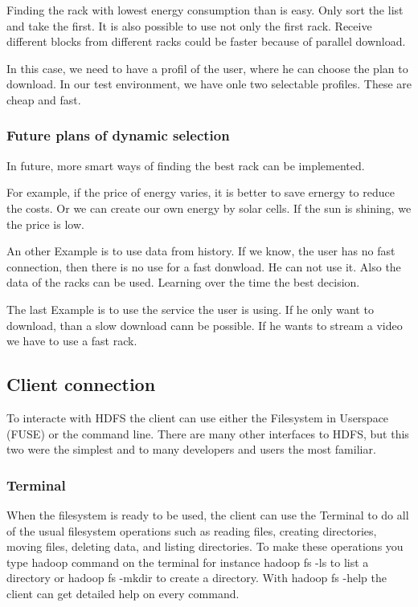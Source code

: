 Finding the rack with lowest energy consumption than is easy. Only sort the list and take the first. It is also possible to use not only the first rack. Receive different blocks from different racks could be faster because of parallel download.

In this case, we need to have a profil of the user, where he can choose the plan to download. In our test environment, we have onle two selectable profiles. These are cheap and fast.

\subsubsection{Future plans of dynamic selection}

In future, more smart ways of finding the best rack can be implemented. 

For example, if the price of energy varies, it is better to save ernergy to reduce the costs. Or we can create our own energy by solar cells. If the sun is shining, we the price is low.

An other Example is to use data from history. If we know, the user has no fast connection, then there is no use for a fast donwload. He can not use it. Also the data of the racks can be used. Learning over the time the best decision.

The last Example is to use the service the user is using. If he only want to download, than a slow download cann be possible. If he wants to stream a video we have to use a fast rack.

\subsection{Client connection}

To interacte with HDFS the client can use either the Filesystem in Userspace (FUSE) or the command line. There are many other interfaces to HDFS, but this two were the simplest and to many developers and users the most familiar.

\label{sec:hdfs_client}

\subsubsection{Terminal}

When the filesystem is ready to be used, the client can use the Terminal to do all of the usual filesystem operations such as reading files, creating directories, moving files, deleting data, and listing directories. To make these operations you type hadoop command on the terminal for instance hadoop fs -ls to list a directory or hadoop fs -mkdir to create a directory. With hadoop fs -help the client can get detailed help on every command.

